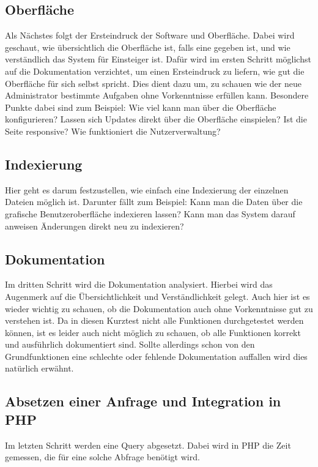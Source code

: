 \subsection{Oberfläche}

Als Nächstes folgt der Ersteindruck der Software und Oberfläche. Dabei wird geschaut, wie übersichtlich die Oberfläche ist, falls eine gegeben ist, und wie verständlich das System für Einsteiger ist. Dafür wird im ersten Schritt möglichst auf die Dokumentation verzichtet, um einen Ersteindruck zu liefern, wie gut die Oberfläche für sich selbst spricht. Dies dient dazu um, zu schauen wie der neue Administrator bestimmte Aufgaben ohne Vorkenntnisse erfüllen kann. Besondere Punkte dabei sind zum Beispiel: Wie viel kann man über die Oberfläche konfigurieren? Lassen sich Updates direkt über die Oberfläche einspielen? Ist die Seite responsive? Wie funktioniert die Nutzerverwaltung?

\subsection{Indexierung}

Hier geht es darum festzustellen, wie einfach eine Indexierung der einzelnen Dateien möglich ist. Darunter fällt zum Beispiel: Kann man die Daten über die grafische Benutzeroberfläche indexieren lassen? Kann man das System darauf anweisen Änderungen direkt neu zu indexieren?


\subsection{Dokumentation}

Im dritten Schritt wird die Dokumentation analysiert. Hierbei wird das Augenmerk auf die Übersichtlichkeit und Verständlichkeit gelegt. Auch hier ist es wieder wichtig zu schauen, ob die Dokumentation auch ohne Vorkenntnisse gut zu verstehen ist. Da in diesen Kurztest nicht alle Funktionen durchgetestet werden können, ist es leider auch nicht möglich zu schauen, ob alle Funktionen korrekt und ausführlich dokumentiert sind. Sollte allerdings schon von den Grundfunktionen eine schlechte oder fehlende Dokumentation auffallen wird dies natürlich erwähnt. 

\subsection{Absetzen einer Anfrage und Integration in PHP}

Im letzten Schritt werden eine Query abgesetzt. Dabei wird in PHP die Zeit gemessen, die für eine solche Abfrage benötigt wird.

